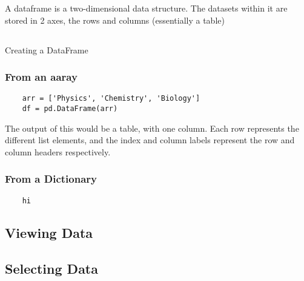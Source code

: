A dataframe is a two-dimensional data structure. The datasets within it are stored in 2 axes, the rows and columns (essentially a table)


\subsection{}{Creating a DataFrame}
\subsubsection{From an aaray}
\begin{verbatim}
    arr = ['Physics', 'Chemistry', 'Biology']
    df = pd.DataFrame(arr)
\end{verbatim}

The output of this would be a table, with one column. Each row represents the different list elements, and the index and column labels represent the row and column headers respectively.

\subsubsection{From a Dictionary}





\begin{verbatim}
    hi
\end{verbatim}














\subsection{Viewing Data}

\subsection{Selecting Data}